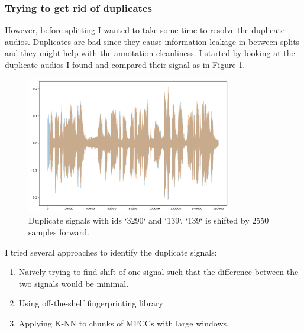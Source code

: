 \documentclass[11pt]{article}
\begin{document}
\subsubsection{Trying to get rid of duplicates}

However, before splitting I wanted to take some time to resolve the duplicate
audios. Duplicates are bad since they cause information leakage in between
splits and they might help with the annotation cleanliness. I started by
looking at the duplicate audios I found and compared their signal as in Figure
\ref{fig:duplicates}.

\begin{figure}
  \centering
  \includegraphics[width=0.8\textwidth]{../notebooks/imgs/duplicate_audio_example.png}

  \caption{Duplicate signals with ids `3290` and `139`. `139` is shifted by
  2550 samples forward.}\label{fig:duplicates}

\end{figure}

I tried several approaches to identify the duplicate signals:

\begin{enumerate}

  \item Naively trying to find shift of one signal such that the difference
    between the two signals would be minimal.

  \item Using off-the-shelf fingerprinting library

  \item Applying K-NN to chunks of MFCCs with large windows.

\end{enumerate}
\end{document}
